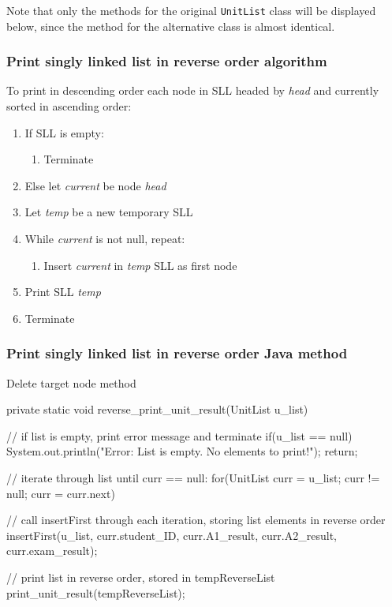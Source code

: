 Note that only the methods for the original \texttt{UnitList} class will be displayed below, since the method for the alternative class is almost identical.

\subsubsection{Print singly linked list in reverse order algorithm}

To print in descending order each node in SLL headed by \emph{head} and currently sorted in ascending order:

\begin{enumerate}
\item If SLL is empty:
	\begin{enumerate}
	\item Terminate
	\end{enumerate}
\item Else let \emph{current} be node \emph{head}
\item Let \emph{temp} be a new temporary SLL
\item While \emph{current} is not null, repeat:
	\begin{enumerate}
	\item Insert \emph{current} in \emph{temp} SLL as first node
	\end{enumerate}
\item Print SLL \emph{temp}
\item Terminate
\end{enumerate}

\subsubsection{Print singly linked list in reverse order Java method}

\begin{listing}[H]
\caption{Delete target node method}
\begin{javacode}
private static void reverse_print_unit_result(UnitList u_list) {

    // if list is empty, print error message and terminate
    if(u_list == null) {
        System.out.println("Error: List is empty. No elements to print!");
        return;
    }

    // iterate through list until curr == null:
    for(UnitList curr = u_list; curr != null; curr = curr.next) {

        // call insertFirst through each iteration, storing list elements in reverse order
        insertFirst(u_list, curr.student_ID, curr.A1_result, curr.A2_result, curr.exam_result);
    }

    // print list in reverse order, stored in tempReverseList
    print_unit_result(tempReverseList);
}
\end{javacode}
\end{listing}

